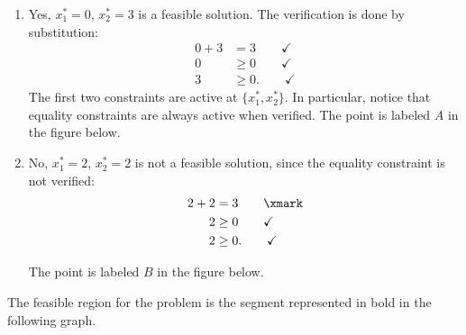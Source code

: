 
\begin{enumerate}
    \item Yes, $x_1^* = 0$, $x_2^* = 3$ is a feasible solution. The verification is done by substitution:
    \begin{align}
     0 + 3 & = 3 \qquad \checkmark \nonumber  \\
     0 & \geq 0 \qquad \checkmark \nonumber  \\
     3 & \geq 0. \qquad \checkmark \nonumber 
    \end{align}
%
    The first two constraints are active at $\{x_1^*, x_2^*\}$. In
    particular, notice that equality constraints are always active
    when verified. The  point is labeled $A$ in the figure below.
    \vspace{1em}
%    
    \item No, $x_1^* = 2$, $x_2^* = 2$ is not a feasible solution, since the equality constraint is not verified:
    \begin{align}
     2 + 2 & = 3 \qquad \xmark \nonumber  \\
     2 & \geq 0 \qquad \checkmark \nonumber \\
     2 & \geq 0. \qquad \checkmark \nonumber
    \end{align}
    \vspace{1em}
    
    The point is labeled $B$ in the figure below.
    
\end{enumerate}

The feasible region for the problem is the segment represented in bold in the following graph.
     
     \begin{center}
    \end{center}


